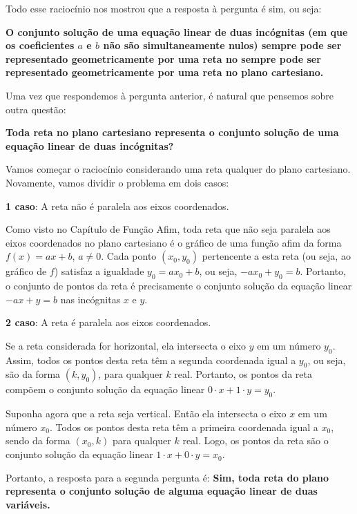 \begin{observation}{}
Todo esse raciocínio nos mostrou que a resposta à pergunta é sim, ou seja:

\textbf{O conjunto solução de uma equação linear de duas incógnitas (em que os coeficientes $a$ e $b$ não são simultaneamente nulos) sempre pode ser representado geometricamente por uma reta no sempre pode ser representado geometricamente por uma reta no plano cartesiano.}

\end{observation}

Uma vez que respondemos à pergunta anterior, é natural que pensemos sobre outra questão:


\begin{observation}{}

\textbf{Toda reta no plano cartesiano representa o conjunto solução de uma equação linear de duas incógnitas?}

Vamos começar o raciocínio considerando uma reta qualquer do plano cartesiano. Novamente, vamos dividir o problema em dois casos:

\textbf{1 caso}: A reta não é paralela aos eixos coordenados.

Como visto no Capítulo de Função Afim, toda reta que não seja paralela aos eixos coordenados no plano cartesiano é o gráfico de uma função afim da forma $f(x) = ax+b$, $a\neq0$. Cada ponto $(x_0,y_0)$ pertencente a esta reta (ou seja, ao gráfico de $f$) satisfaz a igualdade $y_0=ax_0+b$, ou seja, $-ax_0+y_0=b$. Portanto, o conjunto de pontos da reta é precisamente o conjunto solução da equação linear $-ax+y=b$ nas incógnitas $x$ e $y$.

\textbf{2 caso}: A reta é paralela aos eixos coordenados.

Se a reta considerada for horizontal, ela intersecta o eixo $y$ em um número $y_0$. Assim, todos os pontos desta reta têm a segunda coordenada igual a $y_0$, ou seja, são da forma $(k, y_0)$, para qualquer $k$ real. Portanto, os pontos da reta compõem o conjunto solução da equação linear $0\cdot x+1\cdot y=y_0$.

Suponha agora que a reta seja vertical. Então ela intersecta o eixo $x$ em um número $x_0$. Todos os pontos desta reta têm a primeira coordenada igual a $x_0$, sendo da forma $(x_0,k)$ para qualquer $k$ real. Logo, os pontos da reta são o conjunto solução da equação linear $1\cdot x+0\cdot y=x_0$.

Portanto, a resposta para a segunda pergunta é: \textbf{Sim, toda reta do plano representa o conjunto solução de alguma equação linear de duas variáveis.}
\end{observation}


